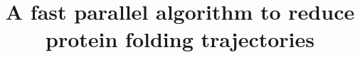 \documentclass[twocolumn]{bmcart}%
\begin{document}
\begin{frontmatter}

\begin{fmbox}


\title{A fast parallel algorithm to reduce protein folding trajectories}

	\author[
		 addressref={aff1},                   %
		 email={lgarreta@agrosavia.co}   %
	]{ }
	\author[
		 addressref={aff2},
		 email={mmartinez@ebi.ac.uk}
	]{ }
	\author[
		 addressref={aff3},
		 email={nediaz@unicauca.edu.co}
	]{ }
	\author[
		 addressref={aff4},
		 corref={aff4},                       %
		 email={pedro.moreno@correounivalle.edu.co}
	]{ }


\end{fmbox}
\end{frontmatter}
\end{document}
